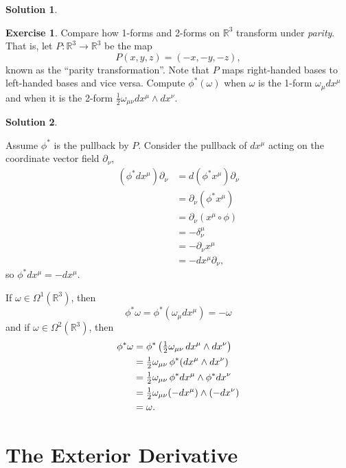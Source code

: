 \documentclass[11pt, a4paper]{report}
\theoremstyle{definition}
\newtheorem{exercise}{Exercise}[part]
\newtheorem{solution}{Solution}[part]
\newenvironment{ex}{\begin{exercise}}{\end{exercise}\pagebreak[1]}
\newenvironment{sol}{\begin{solution}}{\end{solution}\pagebreak[3]}
\newcommand*{\op}[1]{\ensuremath\mathop{}\mathopen{}#1}
\renewcommand*{\d}{\op{d}}
\begin{document}
\begin{sol}
\end{sol}

\begin{ex}

Compare how 1-forms and 2-forms on $\mathbb{R}^3$ transform under \emph{parity}. That is, let $P: \mathbb{R}^3 \to \mathbb{R}^3$ be the map
\[
    P(x, y, z) = (-x, -y, -z),
\]
known as the ``parity transformation''. Note that $P$ maps right-handed bases to left-handed bases and vice versa. Compute $\phi^*(\omega)$ when $\omega$ is the 1-form $\omega_\mu dx^\mu$ and when it is the 2-form $\frac{1}{2}\omega_{\mu\nu}dx^\mu \wedge dx^\nu$.

\end{ex}

\begin{sol}\label{sol:parity1form2form}

Assume $\phi^*$ is the pullback by $P$. Consider the pullback of $dx^\mu$ acting on the coordinate vector field $\partial_\nu$,
\begin{align*}
    (\phi^* dx^\mu) \partial_\nu &= d(\phi^* x^\mu) \partial_\nu \\
        &= \partial_\nu (\phi^* x^\mu) \\
        &= \partial_\nu (x^\mu \circ \phi) \\
        &= -\delta_\nu^\mu \\
        &= -\partial_\nu x^\mu \\
        &= - dx^\mu \partial_\nu,
\end{align*}
so $\phi^* dx^\mu = -dx^\mu$.

If $\omega \in \Omega^1(\mathbb{R}^3)$, then
\[
    \phi^* \omega = \phi^*(\omega_\mu dx^\mu) = -\omega
\]
and if $\omega \in \Omega^2(\mathbb{R}^3)$, then
\begin{align*}
    \phi^* \omega &= \phi^*\left(\tfrac{1}{2}\omega_{\mu\nu} \d x^\mu \wedge dx^\nu\right) \\
        &= \tfrac{1}{2}\omega_{\mu\nu} \, \phi^*(dx^\mu \wedge dx^\nu) \\
        &= \tfrac{1}{2}\omega_{\mu\nu} \, \phi^* dx^\mu \wedge \phi^* dx^\nu \\
        &= \tfrac{1}{2}\omega_{\mu\nu} (-dx^\mu) \wedge (-dx^\nu) \\
        &= \omega.
\end{align*}

\end{sol}

\section{The Exterior Derivative}
\end{document}
